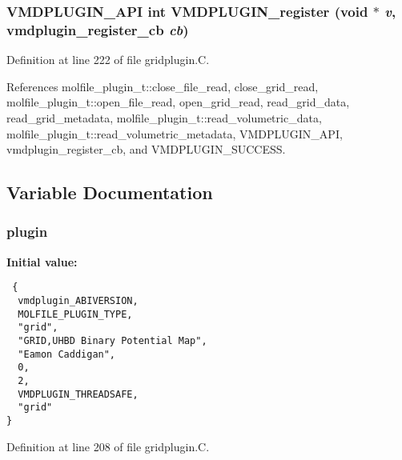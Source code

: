 \subsubsection{\setlength{\rightskip}{0pt plus 5cm}VMDPLUGIN\_\-API int VMDPLUGIN\_\-register (void $\ast$ {\em v}, {\bf vmdplugin\_\-register\_\-cb} {\em cb})}\label{gridplugin_8C_a7}




Definition at line 222 of file gridplugin.C.

References molfile\_\-plugin\_\-t::close\_\-file\_\-read, close\_\-grid\_\-read, molfile\_\-plugin\_\-t::open\_\-file\_\-read, open\_\-grid\_\-read, read\_\-grid\_\-data, read\_\-grid\_\-metadata, molfile\_\-plugin\_\-t::read\_\-volumetric\_\-data, molfile\_\-plugin\_\-t::read\_\-volumetric\_\-metadata, VMDPLUGIN\_\-API, vmdplugin\_\-register\_\-cb, and VMDPLUGIN\_\-SUCCESS.

\subsection{Variable Documentation}
\subsubsection{ plugin\hspace{0.3cm}{\tt  [static]}}\label{gridplugin_8C_a0}


{\bf Initial value:}

\footnotesize\begin{verbatim} {
  vmdplugin_ABIVERSION,              
  MOLFILE_PLUGIN_TYPE,               
  "grid",                            
  "GRID,UHBD Binary Potential Map",  
  "Eamon Caddigan",                  
  0,                                 
  2,                                 
  VMDPLUGIN_THREADSAFE,              
  "grid"                             
}\end{verbatim}\normalsize 


Definition at line 208 of file gridplugin.C.